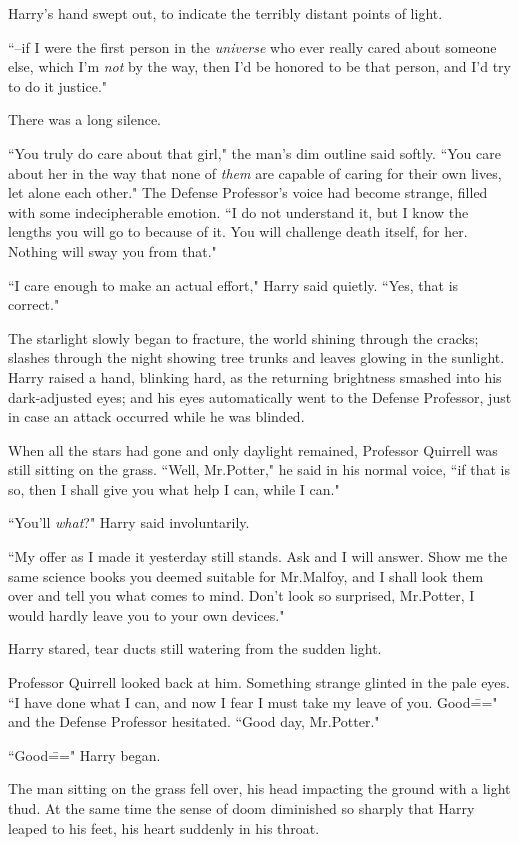 Harry's hand swept out, to indicate the terribly distant points of light.

``\---if I were the first person in the \emph{universe} who ever really cared about someone else, which I'm \emph{not} by the way, then I'd be honored to be that person, and I'd try to do it justice."

There was a long silence.

``You truly do care about that girl," the man's dim outline said softly. ``You care about her in the way that none of \emph{them} are capable of caring for their own lives, let alone each other." The Defense Professor's voice had become strange, filled with some indecipherable emotion. ``I do not understand it, but I know the lengths you will go to because of it. You will challenge death itself, for her. Nothing will sway you from that."

``I care enough to make an actual effort," Harry said quietly. ``Yes, that is correct."

The starlight slowly began to fracture, the world shining through the cracks; slashes through the night showing tree trunks and leaves glowing in the sunlight. Harry raised a hand, blinking hard, as the returning brightness smashed into his dark-adjusted eyes; and his eyes automatically went to the Defense Professor, just in case an attack occurred while he was blinded.

When all the stars had gone and only daylight remained, Professor Quirrell was still sitting on the grass. ``Well, Mr.\?Potter," he said in his normal voice, ``if that is so, then I shall give you what help I can, while I can."

``You'll \emph{what}?" Harry said involuntarily.

``My offer as I made it yesterday still stands. Ask and I will answer. Show me the same science books you deemed suitable for Mr.\?Malfoy, and I shall look them over and tell you what comes to mind. Don't look so surprised, Mr.\?Potter, I would hardly leave you to your own devices."

Harry stared, tear ducts still watering from the sudden light.

Professor Quirrell looked back at him. Something strange glinted in the pale eyes. ``I have done what I can, and now I fear I must take my leave of you. Good\===" and the Defense Professor hesitated. ``Good day, Mr.\?Potter."

``Good\===" Harry began.

The man sitting on the grass fell over, his head impacting the ground with a light thud. At the same time the sense of doom diminished so sharply that Harry leaped to his feet, his heart suddenly in his throat.


